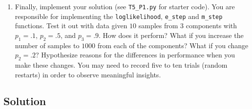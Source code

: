 \documentclass[submit]{harvardml}
\begin{document}
\begin{problem}
\begin{enumerate}
\item Finally, implement your solution (see \texttt{T5\_P1.py} for starter code).  You are responsible for implementing the \texttt{loglikelihood}, \texttt{e\_step} and \texttt{m\_step} functions. Test it out with data given
  $10$ samples from $3$ components with $p_1 = .1$, $p_2=.5$, and
  $p_3=.9$.  How does it perform?  What if you increase the number of
  samples to $1000$ from each of the components?  What if you change
  $p_2=.2$?  Hypothesize reasons for the differences in performance
  when you make these changes. You may need to record five to ten trials (random restarts) in order to observe meaningful insights.

\end{enumerate}



\end{problem}

\subsection*{Solution}

\newpage
\end{document}
